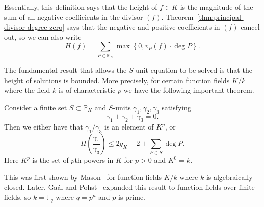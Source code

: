 Essentially, this definition says that the height of \(f \in K\) is the magnitude of the sum of all negative coefficients in the divisor \((f)\). Theorem~\ref{thm:principal-divisor-degree-zero} says that the negative and positive coefficients in \((f)\) cancel out, so we can also write
\[H(f) = \sum_{P \in \mathbb{P}_{K}} \max{\left\{ 0, v_{P}(f) \cdot \deg{P} \right\}}.\]

The fundamental result that allows the \(S\)-unit equation to be solved is that the height of solutions is bounded. More precisely, for certain function fields \(K / k\) where the field \(k\) is of characteristic \(p\) we have the following important theorem.

\begin{theorem}%
  \label{thm:height-bound}
  Consider a finite set \(S \subset \mathbb{P}_{K}\) and \(S\)-units \(\gamma_{1}, \gamma_{2}, \gamma_{3}\) satisfying
  \[\gamma_{1} + \gamma_{2} + \gamma_{3} = 0.\]
  Then we either have that \(\gamma_{1}/\gamma_{3}\) is an element of \(K^{p}\), or
  \[H\left(\frac{\gamma_{1}}{\gamma_{3}}\right) \leq 2g_{K} - 2 + \sum_{P \in S} \deg{P}.\]
  Here \(K^{p}\) is the set of \(p\)th powers in \(K\) for \(p > 0\) and \(K^{0} = k\).
\end{theorem}

This was first shown by Mason~\cite[Lemma 10]{mason-1984-diophantine-equations-over} for function fields \(K / k\) where \(k\) is algebraically closed. Later, Ga\'{a}l and Pohst~\cite{gaal-2006-diophantine-equations-over} expanded this result to function fields over finite fields, so \(k = \mathbb{F}_{q}\) where \(q = p^{n}\) and \(p\) is prime.
